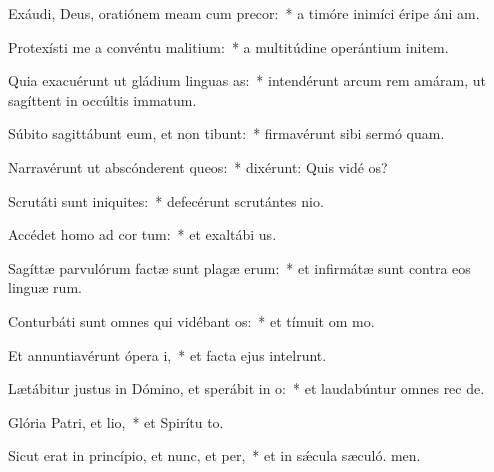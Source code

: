 \item Exáudi, Deus, oratiónem meam cum precor:~* a timóre inimíci éripe áni am.
\item Protexísti me a convéntu malitium:~* a multitúdine operántium initem.
\item Quia exacuérunt ut gládium linguas as:~* intendérunt arcum rem amáram, ut sagíttent in occúltis immatum.
\item Súbito sagittábunt eum, et non tibunt:~* firmavérunt sibi sermó quam.
\item Narravérunt ut abscónderent queos:~* dixérunt: Quis vidé os?
\item Scrutáti sunt iniquites:~* defecérunt scrutántes nio.
\item Accédet homo ad cor tum:~* et exaltábi us.
\item Sagíttæ parvulórum factæ sunt plagæ erum:~* et infirmátæ sunt contra eos linguæ rum.
\item Conturbáti sunt omnes qui vidébant os:~* et tímuit om mo.
\item Et annuntiavérunt ópera i,~* et facta ejus intelrunt.
\item Lætábitur justus in Dómino, et sperábit in o:~* et laudabúntur omnes rec de.
\item Glória Patri, et lio,~* et Spirítu to.
\item Sicut erat in princípio, et nunc, et per,~* et in sǽcula sæculó. men.

